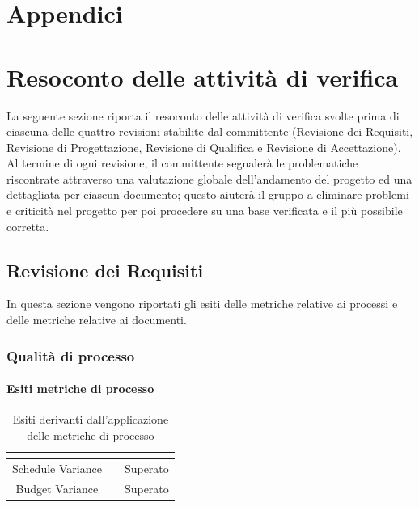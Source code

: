 \appendix
{}
\section*{Appendici}
\section{Resoconto delle attività di verifica}
La seguente sezione riporta il resoconto delle attività di verifica svolte prima di ciascuna delle quattro revisioni stabilite dal committente (Revisione dei Requisiti, Revisione di Progettazione, Revisione di Qualifica e Revisione di Accettazione).
Al termine di ogni revisione, il committente segnalerà le problematiche riscontrate attraverso una valutazione globale dell'andamento del progetto ed una dettagliata per ciascun documento; questo aiuterà il gruppo a eliminare problemi e criticità nel progetto per poi procedere su una base verificata e il più possibile corretta.

\subsection{Revisione dei Requisiti}
In questa sezione vengono riportati gli esiti delle metriche relative ai processi e delle metriche relative ai documenti.
\subsubsection{Qualità di processo}
 
\paragraph{Esiti metriche di processo} \Spazio
\renewcommand{\arraystretch}{1.5}
\begin{table}[H]
	\begin{center}
		\begin{tabular}{|c|c|c|}
			\hline
			\rowcolor{title_row}
			\textbf{\color{title_text}{Documento}} & \textbf{\color{title_text}{Valore ottenuto}} & \textbf{\color{title_text}{Esito}} \\
			\hline
			{Schedule Variance} & {} & {Superato}\\	
			\hline
			{Budget Variance} & {} & {Superato}\\	
			\hline
		\end{tabular}
	\caption[Esiti metriche di processo, Analisi]{Esiti derivanti dall'applicazione delle metriche di processo}	
	\label{tabella: esiti derivanti dall'applicazione delle metriche di processo}
	\end{center}
\end{table}

